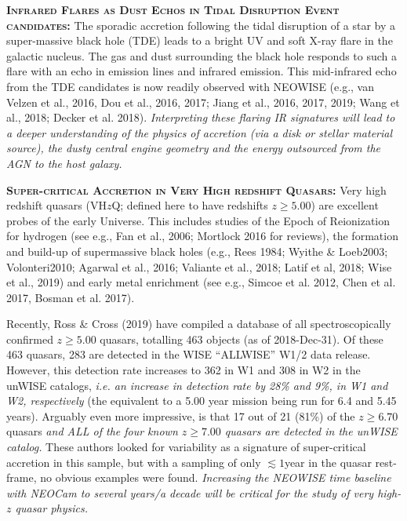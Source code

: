 \documentclass[12pt]{article}
\begin{document}
\smallskip
\smallskip
\noindent
\textbf{\textsc{Infrared Flares as Dust Echos in Tidal Disruption Event candidates:}}   
The sporadic accretion following the tidal disruption of a star by a super-massive black hole (TDE) leads to a bright UV and soft X-ray flare in the galactic nucleus. The gas and dust surrounding the black hole responds to such a flare with an echo in emission lines and infrared emission. This mid-infrared echo from the TDE candidates is now readily observed with NEOWISE (e.g., van Velzen et al., 2016, Dou et al.,  2016, 2017;  Jiang et al., 2016, 2017, 2019; Wang et al., 2018; Decker et al. 2018). {\it Interpreting these flaring IR signatures will lead to 
a deeper understanding of the physics of accretion (via a disk or stellar 
material source), the dusty central engine geometry and the energy
outsourced from the AGN to the host galaxy.}


\smallskip
\smallskip
\noindent
\textbf{\textsc{Super-critical Accretion in Very High redshift Quasars:}} 
Very high redshift quasars (VH$z$Q; defined here to have redshifts $z\geq5.00$) are excellent probes of the early Universe. This includes studies of the Epoch of Reionization for hydrogen (see e.g., Fan et al., 2006; Mortlock 2016 for reviews), the formation and build-up of supermassive black holes (e.g., Rees 1984; Wyithe \& Loeb2003; Volonteri2010; Agarwal et al., 2016; Valiante et al., 2018; Latif et al, 2018; Wise et al., 2019) and early metal enrichment (see e.g., Simcoe et al. 2012, Chen et al. 2017, Bosman et al. 2017).

\smallskip
\smallskip
\noindent
Recently, Ross \& Cross (2019) have compiled a database of all spectroscopically confirmed $z\geq5.00$ quasars, totalling 463 objects (as of 2018-Dec-31). Of these 463 quasars, 283 are detected in the WISE ``ALLWISE'' W1/2 data release. However, this detection rate increases to 362 in W1 and 308 in W2 in the unWISE catalogs, {\it i.e. an increase in detection rate by 28\% and 9\%, in W1 and W2, respectively} (the equivalent to a 5.00 year mission being run for 6.4 and 5.45 years). Arguably even more impressive, is that 17  out of  21 (81\%) of the $z\geq6.70$ quasars {\it and ALL of the four known $z\geq7.00$ quasars are detected in the unWISE catalog.} These authors looked for variability as a signature of super-critical accretion in this sample, but with a sampling of only $\lesssim1$year in the quasar rest-frame, no obvious examples were found. 
{\it Increasing the NEOWISE time baseline with NEOCam to several years/a decade will be 
critical for the study of very high-$z$ quasar physics.} 
\end{document}
